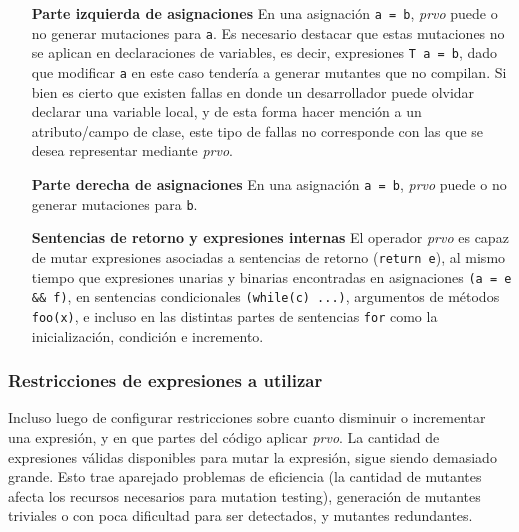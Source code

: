 \begin{enumerate}[leftmargin=.75cm,align=left]
	\item[\textbf{Parte izquierda de asignaciones}] En una asignaci\'on \texttt{a = b}, \emph{prvo} puede o no generar mutaciones para \texttt{a}. Es necesario destacar que estas mutaciones no se aplican en declaraciones de variables, es decir, expresiones \texttt{T a = b}, dado que modificar \texttt{a} en este caso tender\'ia a generar mutantes que no compilan. Si bien es cierto que existen fallas en donde un desarrollador puede olvidar declarar una variable local, y de esta forma hacer menci\'on a un atributo/campo de clase, este tipo de fallas no corresponde con las que se desea representar mediante \emph{prvo}.
	
	\item[\textbf{Parte derecha de asignaciones}] En una asignaci\'on \texttt{a = b}, \emph{prvo} puede o no generar mutaciones para \texttt{b}.
	
	\item[\textbf{Sentencias de retorno y expresiones internas}] El operador \emph{prvo} es capaz de mutar expresiones asociadas a sentencias de retorno (\texttt{return e}), al mismo tiempo que expresiones unarias y binarias encontradas en asignaciones \texttt{(a = e \&\& f)}, en sentencias condicionales \texttt{(while(c) ...)}, argumentos de m\'etodos \texttt{foo(x)}, e incluso en las distintas partes de sentencias \texttt{for} como la inicializaci\'on, condici\'on e incremento.
\end{enumerate}

\subsubsection{Restricciones de expresiones a utilizar}

Incluso luego de configurar restricciones sobre cuanto disminuir o incrementar una expresi\'on, y en que partes del c\'odigo aplicar \emph{prvo}. La cantidad de expresiones v\'alidas disponibles para mutar la expresi\'on, sigue siendo demasiado grande. Esto trae aparejado problemas de eficiencia (la cantidad de mutantes afecta los recursos necesarios para mutation testing), generaci\'on de mutantes triviales o con poca dificultad para ser detectados, y mutantes redundantes.

